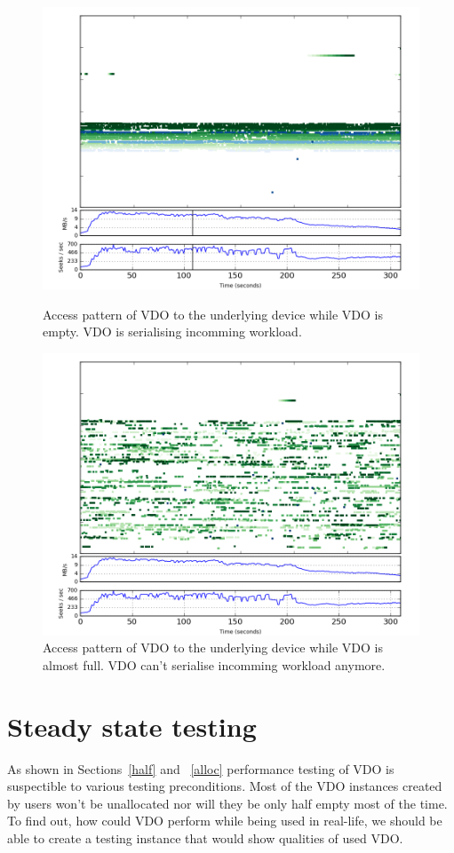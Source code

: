 \documentclass[
  color, %
  table, %
  lof,   %
  lot,   %
]{fithesis3}
\begin{document}
\begin{figure}[!htb]
        \centering
        \includegraphics[width=\textwidth]{../results/half/start}
\caption[Access pattern]{Access pattern of VDO to the underlying device while VDO is empty. VDO is serialising incomming workload.}
\label{fig:half-start}
        \centering
        \includegraphics[width=\textwidth]{../results/half/end}
\caption[Access pattern]{Access pattern of VDO to the underlying device while VDO is almost full. VDO can't serialise incomming workload anymore.}
\label{fig:half-end}
\end{figure}


\section{Steady state testing}
As shown in Sections~\ref{half} and ~\ref{alloc} performance testing of VDO is suspectible to various testing preconditions. Most of the VDO instances created by users won't be unallocated nor will they be only half empty most of the time. To find out, how could VDO perform while being used in real-life, we should be able to create a testing instance that would show qualities of used VDO.
\end{document}
